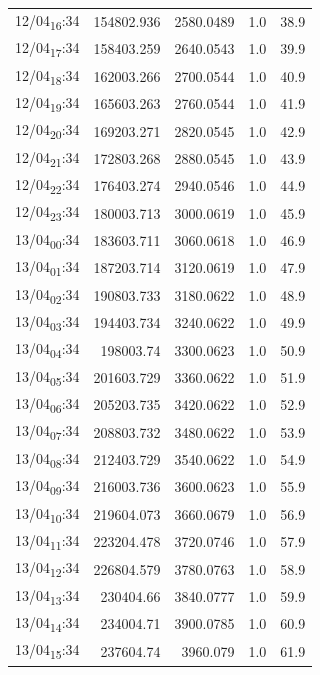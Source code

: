 \documentclass[11pt]{article}
\begin{document}
\begin{center}
\begin{tabular}{lrrrr}
12/04\textsubscript{16}:34 & 154802.936 & 2580.0489 & 1.0 & 38.9\\[0pt]
12/04\textsubscript{17}:34 & 158403.259 & 2640.0543 & 1.0 & 39.9\\[0pt]
12/04\textsubscript{18}:34 & 162003.266 & 2700.0544 & 1.0 & 40.9\\[0pt]
12/04\textsubscript{19}:34 & 165603.263 & 2760.0544 & 1.0 & 41.9\\[0pt]
12/04\textsubscript{20}:34 & 169203.271 & 2820.0545 & 1.0 & 42.9\\[0pt]
12/04\textsubscript{21}:34 & 172803.268 & 2880.0545 & 1.0 & 43.9\\[0pt]
12/04\textsubscript{22}:34 & 176403.274 & 2940.0546 & 1.0 & 44.9\\[0pt]
12/04\textsubscript{23}:34 & 180003.713 & 3000.0619 & 1.0 & 45.9\\[0pt]
13/04\textsubscript{00}:34 & 183603.711 & 3060.0618 & 1.0 & 46.9\\[0pt]
13/04\textsubscript{01}:34 & 187203.714 & 3120.0619 & 1.0 & 47.9\\[0pt]
13/04\textsubscript{02}:34 & 190803.733 & 3180.0622 & 1.0 & 48.9\\[0pt]
13/04\textsubscript{03}:34 & 194403.734 & 3240.0622 & 1.0 & 49.9\\[0pt]
13/04\textsubscript{04}:34 & 198003.74 & 3300.0623 & 1.0 & 50.9\\[0pt]
13/04\textsubscript{05}:34 & 201603.729 & 3360.0622 & 1.0 & 51.9\\[0pt]
13/04\textsubscript{06}:34 & 205203.735 & 3420.0622 & 1.0 & 52.9\\[0pt]
13/04\textsubscript{07}:34 & 208803.732 & 3480.0622 & 1.0 & 53.9\\[0pt]
13/04\textsubscript{08}:34 & 212403.729 & 3540.0622 & 1.0 & 54.9\\[0pt]
13/04\textsubscript{09}:34 & 216003.736 & 3600.0623 & 1.0 & 55.9\\[0pt]
13/04\textsubscript{10}:34 & 219604.073 & 3660.0679 & 1.0 & 56.9\\[0pt]
13/04\textsubscript{11}:34 & 223204.478 & 3720.0746 & 1.0 & 57.9\\[0pt]
13/04\textsubscript{12}:34 & 226804.579 & 3780.0763 & 1.0 & 58.9\\[0pt]
13/04\textsubscript{13}:34 & 230404.66 & 3840.0777 & 1.0 & 59.9\\[0pt]
13/04\textsubscript{14}:34 & 234004.71 & 3900.0785 & 1.0 & 60.9\\[0pt]
13/04\textsubscript{15}:34 & 237604.74 & 3960.079 & 1.0 & 61.9\\[0pt]

\end{tabular}
\end{center}
\end{document}
